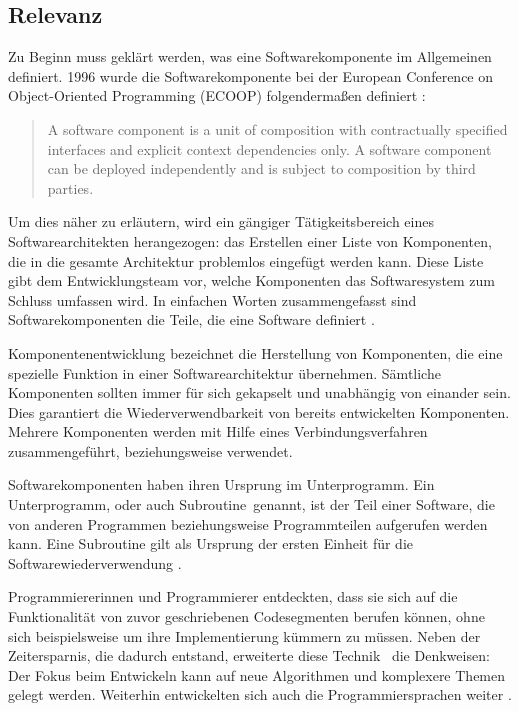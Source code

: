 \subsection{Relevanz}
\label{sec:1_Relevanz}


Zu Beginn muss geklärt werden, was eine Softwarekomponente im Allgemeinen definiert. 1996 wurde die Softwarekomponente bei der European Conference on Object-Oriented Programming (ECOOP) folgendermaßen definiert \citereset \autocite[siehe][S. 35-47]{Szyperski.2002}:
\begin{quote}
\glqq A software component is a unit of composition with contractually specified interfaces and explicit context dependencies only. A software component can be deployed independently and is subject to composition by third parties.\grqq
\end{quote}
Um dies näher zu erläutern, wird ein gängiger Tätigkeitsbereich eines Softwarearchitekten herangezogen: das Erstellen einer Liste von Komponenten, die in die gesamte Architektur problemlos eingefügt werden kann. Diese Liste gibt dem Entwicklungsteam vor, welche Komponenten das Softwaresystem zum Schluss umfassen wird. In einfachen Worten zusammengefasst sind Softwarekomponenten die Teile, die eine Software definiert \citereset \autocite[siehe][S. 35-47]{Szyperski.2002}.

Komponentenentwicklung bezeichnet die Herstellung von Komponenten, die eine spezielle Funktion in einer Softwarearchitektur übernehmen. Sämtliche Komponenten sollten immer für sich gekapselt und unabhängig von einander sein. Dies garantiert die Wiederverwendbarkeit von bereits entwickelten Komponenten. Mehrere Komponenten werden mit Hilfe eines Verbindungsverfahren zusammengeführt, beziehungsweise verwendet.

Softwarekomponenten haben ihren Ursprung im \glqq Unterprogramm\grqq . Ein \glqq Unterprogramm\grqq , oder auch \glqq Subroutine\grqq\ genannt, ist der Teil einer Software, die von anderen Programmen beziehungsweise Programmteilen aufgerufen werden kann. Eine Subroutine gilt als Ursprung der ersten Einheit für die Softwarewiederverwendung \citereset \autocite[siehe][]{Wheeler.1985}.

Programmiererinnen und Programmierer entdeckten, dass sie sich auf die Funktionalität von zuvor geschriebenen Codesegmenten berufen können, ohne sich beispielsweise um ihre Implementierung kümmern zu müssen. Neben der Zeitersparnis, die dadurch entstand, erweiterte diese \glqq Technik \grqq\ die Denkweisen: Der Fokus beim Entwickeln kann auf neue Algorithmen und komplexere Themen gelegt werden. Weiterhin entwickelten sich auch die Programmiersprachen weiter \citereset \autocite[siehe][S. 3-12]{Szyperski.2002}.

